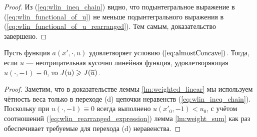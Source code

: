 \begin{proof}
Из (\ref{eq:wlin_ineq_chain}) видно, что подынтегральное выражение в (\ref{eq:wlin_functional_of_u}) не меньше
подынтегрального выражения в (\ref{eq:wlin_functional_of_u_rearranged}).
Тем самым, доказательство завершено.
\end{proof}

\begin{lm}
Пусть функция $a(x', \cdot, u)$ удовлетворяет условию $(\ref{eq:almostConcave})$.
Тогда, если $u$ --- неотрицательная кусочно линейная функция, удовлетворяющая $u(\cdot, -1) \equiv 0$,
то $\IWg( u ) \ge \IWg( \mon{u} )$.
\end{lm}

\begin{proof}
Заметим, что в доказательстве леммы \ref{lm:weighted_linear}
мы используем чётность веса только в переходе (d) цепочки неравенств (\ref{eq:wlin_ineq_chain}).
Поскольку при $u(\cdot, -1) \equiv 0$ всегда выполнено $u(x'_0, -1) < u_0$,
с учётом соотношений (\ref{eq:wlin_rearranged_expression}) лемма \ref{lm:weight_sum} как раз обеспечивает требуемые для перехода (d) неравенства.
\end{proof}
